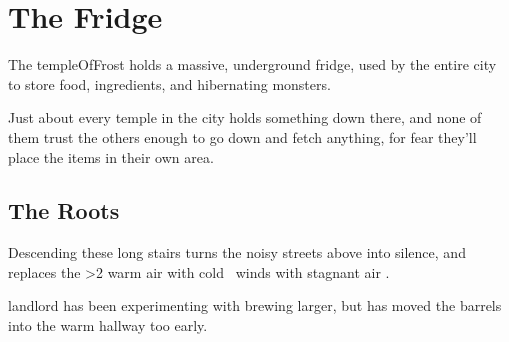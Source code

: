 \section{The Fridge}

\begin{multicols}{2}

\noindent
The \gls{templeOfFrost} holds a massive, underground fridge, used by the entire city to store food, \glspl{ingredient}, and hibernating \glspl{monster}.

Just about every \gls{temple} in the city holds something down there, and none of them trust the others enough to go down and fetch anything, for fear they'll place the items in their own area.

\renewcommand\csComments{
  \callout{12,21}{0,0}{\ref{fStairs}:~\nameref{fStairs}}{}
  \callout[12]{12,18}{0,0.5}{\ref{fHallStore}:~\nameref{fHallStore}}{}
  \callout[10]{10,15}{0,0}{\ref{fLift}:~\nameref{fLift}}{}
  \callout[10]{17,20}{-1,0}{\ref{fWheat}:~\nameref{fWheat}}{chalk lines the ground}
  \callout[10]{17,18}{-1,0}{\ref{fIngStore}:~\nameref{fIngStore}}{}
  \callout[10]{1,22}{2,-1}{\ref{fOffice}:~\nameref{fOffice}}{Everything entered must be registered}
  \callout[14]{2,17}{2,0}{\ref{fDip}:~\nameref{fDip}}{with oil barrels}
  \callout[10]{1,14}{2,-1}{\ref{fSide}:~\nameref{fSide}}{}
  \callout{12,16}{1,0}{Secrets}{}
  \callout{6,11}{4,0}{\ref{fBoat}:~\nameref{fBoat}}{there's a boat}
  \callout{8,0}{0,2.5}{\ref{fCrossbow}:~\nameref{fCrossbow}}{}
  \callout[10]{5,1}{0,0}{\ref{fHibernation}:~\nameref{fHibernation}}{}
  \callout[10]{11,1}{0,0}{\ref{fWeaponStore}:~\nameref{fWeaponStore}}{}
  \callout{17,7}{-1.8,-2.3}{\ref{fFabrics}:~\nameref{fFabrics}}{}
  \callout[10]{17,4}{-1,-2}{\ref{fGrain}:~\nameref{fGrain}}{}
  \callout[10]{16,1}{0,0}{\ref{fSpirits}:~\nameref{fSpirits}}{}
}


\subsection{The Roots}


Descending these long stairs turns the noisy streets above into silence, and replaces the
\ifnum\value{temperature}>2%
  warm air with cold%
\else%
  \showTemperature\ winds with stagnant air%
\fi.

\begin{exampletext}
   \gls{landlord} has been experimenting with brewing larger, but has moved the barrels into the warm hallway too early.
\end{exampletext}


\end{multicols}
